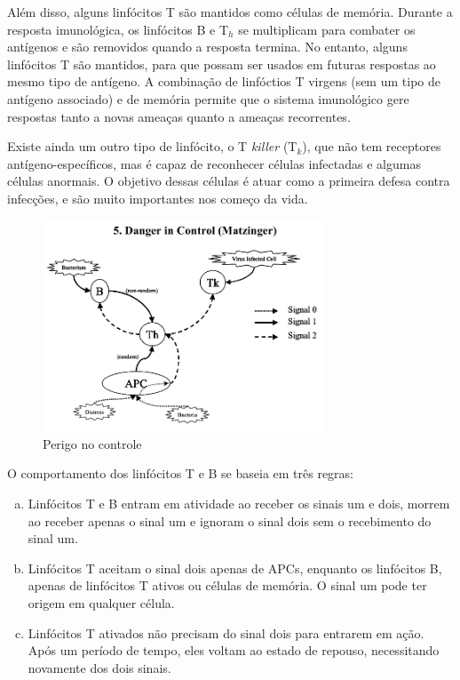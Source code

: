 Além disso, alguns linfócitos T são mantidos como células de memória. Durante a resposta imunológica, os linfócitos B e T$_{h}$ se multiplicam para combater os antígenos e são removidos quando a resposta termina. No entanto, alguns linfócitos T são mantidos, para que possam ser usados em futuras respostas ao mesmo tipo de antígeno. A combinação de linfóctios T virgens (sem um tipo de antígeno associado) e de memória permite que o sistema imunológico gere respostas tanto a novas ameaças quanto a ameaças recorrentes.

Existe ainda um outro tipo de linfócito, o T \emph{killer} (T$_{k}$), que não tem receptores antígeno-específicos, mas é capaz de reconhecer células infectadas e algumas células anormais. O objetivo dessas células é atuar como a primeira defesa contra infecções, e são muito importantes nos começo da vida.

\begin{figure}[h!]
\centering
\includegraphics[width=0.75\textwidth]{img/signals5-danger.png}
\caption{Perigo no controle \cite{Aickelin2002}}
\label{img:nis_danger}
\end{figure}

O comportamento dos linfócitos T e B se baseia em três regras:

\begin{enumerate}[a)]
\item Linfócitos T e B entram em atividade ao receber os sinais um e dois, morrem ao receber apenas o sinal um e ignoram o sinal dois sem o recebimento do sinal um.
\item Linfócitos T aceitam o sinal dois apenas de APCs, enquanto os linfócitos B, apenas de linfócitos T ativos ou células de memória. O sinal um pode ter origem em qualquer célula.
\item Linfócitos T ativados não precisam do sinal dois para entrarem em ação. Após um período de tempo, eles voltam ao estado de repouso, necessitando novamente dos dois sinais.
\end{enumerate}

